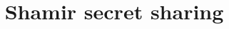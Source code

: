 \documentclass{article}
\begin{document}
\title{Shamir secret sharing}
\date{}
\maketitle
\end{document}
